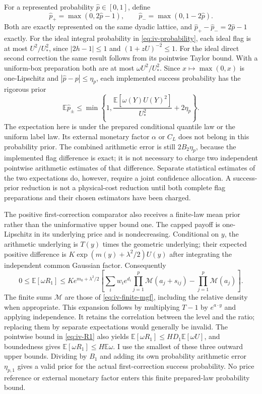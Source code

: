 For a represented probability $\widehat p\in[0,1]$, define
\begin{equation}
 \widehat p_+=\max(0,2\widehat p-1),\qquad
 \widehat p_-=\max(0,1-2\widehat p).
 \label{eq:iv-rare-flags}
\end{equation}
Both are exactly represented on the same dyadic lattice, and
$\widehat p_+-\widehat p_-=2\widehat p-1$ exactly.  For the ideal integral
probability in \eqref{eq:iv-probability}, each ideal flag is at most
$U^2/U_*^2$, since $|2h-1|\leq1$ and $(1+zU)^{-2}\leq1$.
For the ideal direct second correction the same result follows from its
pointwise Taylor bound.  With a uniform-box preparation both are at most
$\omega U^2/U_*^2$.  Since $x\mapsto\max(0,x)$ is one-Lipschitz and
$|\widehat p-p|\leq\eta_p$, each implemented success probability has the
rigorous prior
\begin{equation}
 \mathbb E\widehat p_\pm\leq
 \min\!\left\{1,\frac{\mathbb E[\omega(Y)U(Y)^2]}{U_*^2}+2\eta_p\right\}.
 \label{eq:iv-rare-prior}
\end{equation}
The expectation here is under the prepared conditional quantile law or the
uniform label law.  Its external monetary factor $\alpha$ or $C_L$ does not
belong in this probability prior.  The combined arithmetic error is still
$2B_2\eta_p$, because the implemented flag difference is exact; it is not
necessary to charge two independent pointwise arithmetic estimates of that
difference.  Separate statistical estimates of the two expectations do,
however, require a joint confidence allocation.  A success-prior reduction
is not a physical-cost reduction until both complete flag preparations and
their chosen estimators have been charged.

The positive first-correction comparator also receives a finite-law mean
prior rather than the uninformative upper bound one.  The capped payoff is
one-Lipschitz in its underlying price and is nondecreasing.  Conditional on
$y$, the arithmetic underlying is $T(y)$ times the geometric underlying;
their expected positive difference is
$K\exp(m(y)+\lambda^2/2)U(y)$ after integrating the independent common
Gaussian factor.  Consequently
\begin{equation}
 0\leq\mathbb E[\omega R_1]\leq
 K e^{m_0+\lambda^2/2}\left[
 \sum_iw_ie^{d_i}\prod_{j=1}^p\mathcal M(a_j+s_{ij})
 -\prod_{j=1}^p\mathcal M(a_j)\right].
 \label{eq:iv-R1-correlated-gap}
\end{equation}
The finite sums $\mathcal M$ are those of
\eqref{eq:iv-finite-mgf}, including the relative density when appropriate.
This expansion follows by multiplying $T-1$ by $e^{a\cdot y}$ and applying
independence.  It retains the correlation between the level and the ratio;
replacing them by separate expectations would generally be invalid.
The pointwise bound in \eqref{eq:iv-R1} also yields
$\mathbb E[\omega R_1]\leq HD_1\mathbb E[\omega U]$, and boundedness gives
$\mathbb E[\omega R_1]\leq H\mathbb E\omega$.  I use the smallest of
these three outward upper bounds.  Dividing by $B_1$ and adding its own
probability arithmetic error $\eta_{p,1}$ gives a valid prior for the actual
first-correction success probability.  No price reference or external
monetary factor enters this finite prepared-law probability bound.


